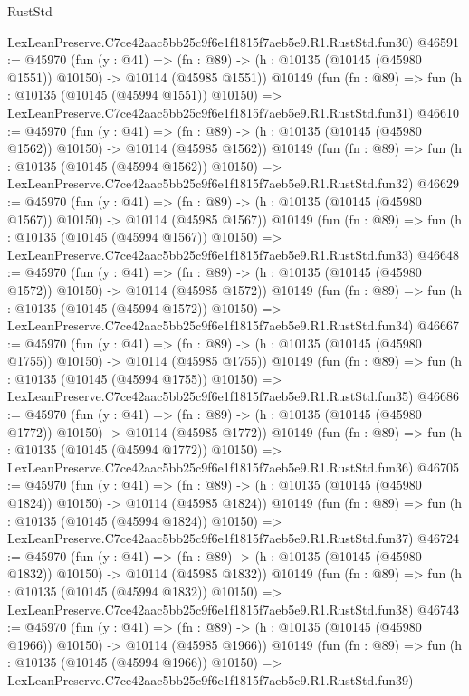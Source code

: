 \begin{lexlean}{RustStd}
\begin{coremodule}
    LexLeanPreserve.C7ce42aac5bb25c9f6e1f1815f7aeb5e9.R1.RustStd.fun30)
@46591 := @45970
    (fun (y : @41) =>
    (fn : @89) -> (h : @10135 (@10145 (@45980 @1551)) @10150) -> @10114 (@45985 @1551))
    @10149
    (fun (fn : @89) =>
    fun (h : @10135 (@10145 (@45994 @1551)) @10150) =>
    LexLeanPreserve.C7ce42aac5bb25c9f6e1f1815f7aeb5e9.R1.RustStd.fun31)
@46610 := @45970
    (fun (y : @41) =>
    (fn : @89) -> (h : @10135 (@10145 (@45980 @1562)) @10150) -> @10114 (@45985 @1562))
    @10149
    (fun (fn : @89) =>
    fun (h : @10135 (@10145 (@45994 @1562)) @10150) =>
    LexLeanPreserve.C7ce42aac5bb25c9f6e1f1815f7aeb5e9.R1.RustStd.fun32)
@46629 := @45970
    (fun (y : @41) =>
    (fn : @89) -> (h : @10135 (@10145 (@45980 @1567)) @10150) -> @10114 (@45985 @1567))
    @10149
    (fun (fn : @89) =>
    fun (h : @10135 (@10145 (@45994 @1567)) @10150) =>
    LexLeanPreserve.C7ce42aac5bb25c9f6e1f1815f7aeb5e9.R1.RustStd.fun33)
@46648 := @45970
    (fun (y : @41) =>
    (fn : @89) -> (h : @10135 (@10145 (@45980 @1572)) @10150) -> @10114 (@45985 @1572))
    @10149
    (fun (fn : @89) =>
    fun (h : @10135 (@10145 (@45994 @1572)) @10150) =>
    LexLeanPreserve.C7ce42aac5bb25c9f6e1f1815f7aeb5e9.R1.RustStd.fun34)
@46667 := @45970
    (fun (y : @41) =>
    (fn : @89) -> (h : @10135 (@10145 (@45980 @1755)) @10150) -> @10114 (@45985 @1755))
    @10149
    (fun (fn : @89) =>
    fun (h : @10135 (@10145 (@45994 @1755)) @10150) =>
    LexLeanPreserve.C7ce42aac5bb25c9f6e1f1815f7aeb5e9.R1.RustStd.fun35)
@46686 := @45970
    (fun (y : @41) =>
    (fn : @89) -> (h : @10135 (@10145 (@45980 @1772)) @10150) -> @10114 (@45985 @1772))
    @10149
    (fun (fn : @89) =>
    fun (h : @10135 (@10145 (@45994 @1772)) @10150) =>
    LexLeanPreserve.C7ce42aac5bb25c9f6e1f1815f7aeb5e9.R1.RustStd.fun36)
@46705 := @45970
    (fun (y : @41) =>
    (fn : @89) -> (h : @10135 (@10145 (@45980 @1824)) @10150) -> @10114 (@45985 @1824))
    @10149
    (fun (fn : @89) =>
    fun (h : @10135 (@10145 (@45994 @1824)) @10150) =>
    LexLeanPreserve.C7ce42aac5bb25c9f6e1f1815f7aeb5e9.R1.RustStd.fun37)
@46724 := @45970
    (fun (y : @41) =>
    (fn : @89) -> (h : @10135 (@10145 (@45980 @1832)) @10150) -> @10114 (@45985 @1832))
    @10149
    (fun (fn : @89) =>
    fun (h : @10135 (@10145 (@45994 @1832)) @10150) =>
    LexLeanPreserve.C7ce42aac5bb25c9f6e1f1815f7aeb5e9.R1.RustStd.fun38)
@46743 := @45970
    (fun (y : @41) =>
    (fn : @89) -> (h : @10135 (@10145 (@45980 @1966)) @10150) -> @10114 (@45985 @1966))
    @10149
    (fun (fn : @89) =>
    fun (h : @10135 (@10145 (@45994 @1966)) @10150) =>
    LexLeanPreserve.C7ce42aac5bb25c9f6e1f1815f7aeb5e9.R1.RustStd.fun39)

\end{coremodule}
\end{lexlean}
